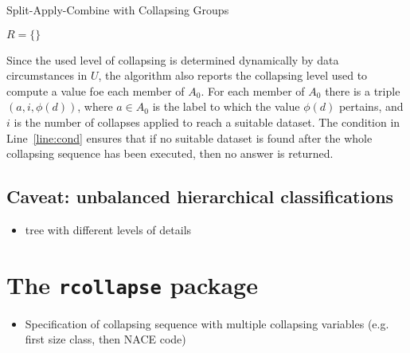 \documentclass[11pt, fleqn]{article}
\begin{document}
%
\begin{algorithm}[H]
\caption{Split-Apply-Combine with Collapsing Groups}
\label{alg:saccg}


$R = \{\}$\;

\end{algorithm}
%
Since the used level of collapsing is determined dynamically by data
circumstances in $U$, the algorithm also reports the collapsing level used to
compute a value foe each member of $A_0$. For each member of $A_0$ there is a
triple $(a,i,\phi(d))$, where $a\in A_0$ is the label to which the value
$\phi(d)$ pertains, and $i$ is the number of collapses applied to reach a
suitable dataset. The condition in Line~\ref{line:cond} ensures that if
no suitable dataset is found after the whole collapsing sequence has been
executed, then no answer is returned.



\subsection{Caveat: unbalanced hierarchical classifications}
\begin{itemize}
\item tree with different levels of details
\end{itemize}

\section{The \texttt{rcollapse} package}

\begin{itemize}
\item{Specification of collapsing sequence with multiple collapsing variables (e.g. first size class, then NACE code)}
\end{itemize}



\end{document}
